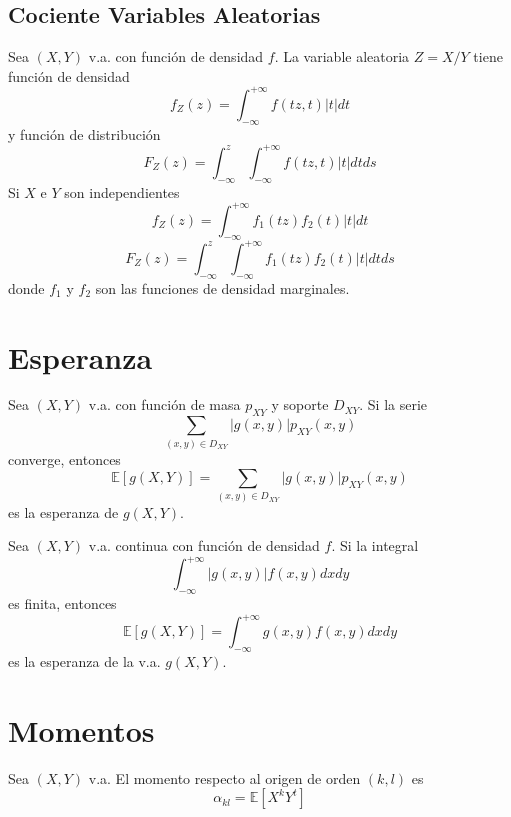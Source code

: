 \subsection{Cociente Variables Aleatorias}

\begin{prop}
  Sea $(X,Y)$ v.a. con función de densidad $f$. La variable aleatoria $Z = X / Y$ tiene función de densidad
  \[ 
    f_{Z}(z) = \int_{-\infty}^{+\infty} f(tz, t) | t | dt
  \] 
  y función de distribución
  \[ 
    F_{Z}(z) = \int_{-\infty}^{z} \int_{-\infty}^{+\infty} f(tz, t) | t | dt ds
  \] 
  Si $X$ e $Y$ son independientes
  \[ 
    f_{Z}(z) = \int_{-\infty}^{+\infty} f_{1}(tz)f_{2}(t) | t | dt
  \] 
  \[ 
    F_{Z}(z) = \int_{-\infty}^{z} \int_{-\infty}^{+\infty} f_{1}(tz)f_{2}(t) | t | dt ds
  \] 
  donde $f_{1}$ y $f_{2}$ son las funciones de densidad marginales.
\end{prop}

\section{Esperanza}

\begin{defn}
  Sea $(X,Y)$ v.a. con función de masa $p_{XY}$ y soporte $D_{XY}$. Si la serie
  \[ 
    \sum_{(x,y) \in D_{XY}} | g(x,y) | p_{XY}(x,y)
  \] 
  converge, entonces
  \[ 
    \mathbb{E} [ g(X,Y) ] = \sum_{(x,y) \in D_{XY}} | g(x,y) | p_{XY}(x,y)
  \] 
  es la esperanza de $g(X,Y)$.
\end{defn}

\begin{defn}
  Sea $(X,Y)$ v.a. continua con función de densidad $f$. Si la integral
  \[ 
    \int_{-\infty}^{+\infty} | g(x,y) | f(x,y) dx dy 
  \] 
  es finita, entonces
  \[ 
    \mathbb{E} [ g(X,Y) ] = \int_{-\infty}^{+\infty}  g(x,y)  f(x,y) dx dy 
  \] 
  es la esperanza de la v.a. $g(X,Y)$.
\end{defn}

\section{Momentos}

\begin{defn}
  Sea $(X,Y)$ v.a. El momento respecto al origen de orden $(k,l)$ es
  \[ 
    \alpha_{kl} = \mathbb{E} [ X^{k} Y^{t} ] 
  \] 
\end{defn}


